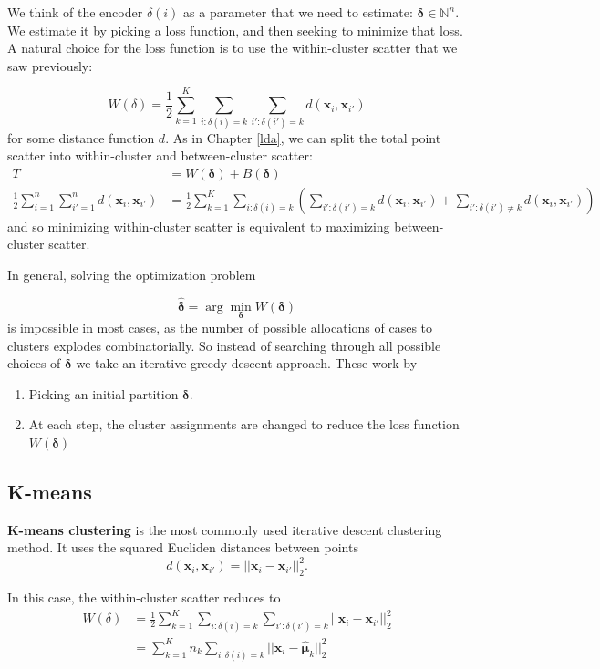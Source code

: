 \documentclass[
]{book}
\providecommand{\tightlist}{%
  \setlength{\itemsep}{0pt}\setlength{\parskip}{0pt}}
\theoremstyle{definition}
\theoremstyle{definition}
\theoremstyle{definition}
\theoremstyle{definition}
\theoremstyle{remark}
\begin{document}
We think of the encoder \(\delta(i)\) as a parameter that we need to estimate: \(\boldsymbol \delta\in \mathbb{N}^{n}\). We estimate it by picking a loss function, and then seeking to minimize that loss. A natural choice for the loss function is to use the within-cluster scatter that we saw previously:

\[W(\delta) = \frac{1}{2}\sum_{k=1}^K \sum_{i: \delta(i)=k} \sum_{i': \delta(i')=k} d(\mathbf x_i, \mathbf x_{i'})\]
for some distance function \(d\). As in Chapter \ref{lda}, we can split the total point scatter into within-cluster and between-cluster scatter:
\begin{align}
T&= W(\boldsymbol \delta)+B(\boldsymbol \delta)\\
\frac{1}{2}\sum_{i=1}^n \sum_{i'=1}^n d(\mathbf x_i, \mathbf x_{i'})&= \frac{1}{2}\sum_{k=1}^K \sum_{i: \delta(i)=k} \left(\sum_{i': \delta(i')=k} d(\mathbf x_i, \mathbf x_{i'})+\sum_{i': \delta(i')\not=k} d(\mathbf x_i, \mathbf x_{i'})\right)
\end{align}
and so minimizing within-cluster scatter is equivalent to maximizing between-cluster scatter.

In general, solving the optimization problem

\[\hat{\boldsymbol \delta} = \arg \min_{\boldsymbol \delta} W(\boldsymbol \delta)\]
is impossible in most cases, as the number of possible allocations of cases to clusters explodes combinatorially. So instead of searching through all possible choices of \(\boldsymbol \delta\) we take an iterative greedy descent approach. These work by

\begin{enumerate}
\def\labelenumi{\arabic{enumi}.}
\tightlist
\item
  Picking an initial partition \(\boldsymbol \delta\).
\item
  At each step, the cluster assignments are changed to reduce the loss function \(W(\boldsymbol \delta)\)
\end{enumerate}

\subsection{K-means}\label{k-means}

\textbf{K-means clustering} is the most commonly used iterative descent clustering method. It uses the squared Eucliden distances between points
\[d(\mathbf x_i, \mathbf x_{i'})=||\mathbf x_i - \mathbf x_{i'}||_2^2.\]

In this case, the within-cluster scatter reduces to
\begin{align}
W(\delta) &= \frac{1}{2}\sum_{k=1}^K \sum_{i: \delta(i)=k} \sum_{i': \delta(i')=k} ||\mathbf x_i - \mathbf x_{i'}||_2^2 \\
&= \sum_{k=1}^K n_k \sum_{i: \delta(i)=k} ||\mathbf x_{i} - \hat{{\boldsymbol{\mu}}}_k||_2^2 \label{eq:Wscatterk}\\
\end{align}
\end{document}
